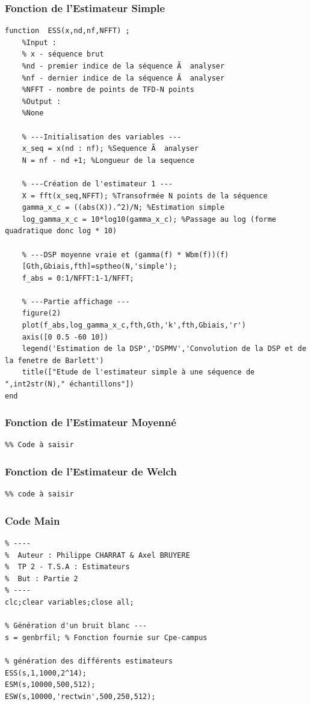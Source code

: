\documentclass{article}
\begin{document}
\subsubsection{Fonction de l'Estimateur Simple }
\begin{verbatim}
function  ESS(x,nd,nf,NFFT) ;
    %Input : 
    % x - séquence brut 
    %nd - premier indice de la séquence Ã  analyser
    %nf - dernier indice de la séquence Ã  analyser
    %NFFT - nombre de points de TFD-N points
    %Output : 
    %None
    
    % ---Initialisation des variables ---
    x_seq = x(nd : nf); %Sequence Ã  analyser
    N = nf - nd +1; %Longueur de la sequence
    
    % ---Création de l'estimateur 1 ---
    X = fft(x_seq,NFFT); %Transofrmée N points de la séquence  
    gamma_x_c = ((abs(X)).^2)/N; %Estimation simple
    log_gamma_x_c = 10*log10(gamma_x_c); %Passage au log (forme quadratique donc log * 10)
    
    % ---DSP moyenne vraie et (gamma(f) * Wbm(f))(f)
    [Gth,Gbiais,fth]=sptheo(N,'simple');
    f_abs = 0:1/NFFT:1-1/NFFT;
    
    % ---Partie affichage ---
    figure(2)
    plot(f_abs,log_gamma_x_c,fth,Gth,'k',fth,Gbiais,'r')
    axis([0 0.5 -60 10])
    legend('Estimation de la DSP','DSPMV','Convolution de la DSP et de la fenetre de Barlett')
    title(["Etude de l'estimateur simple à une séquence de ",int2str(N)," échantillons"])
end
\end{verbatim}
\newpage
\subsubsection{Fonction de l'Estimateur Moyenné }
\begin{verbatim}
%% Code à saisir 
\end{verbatim}
\newpage
\subsubsection{Fonction de l'Estimateur de Welch }
\begin{verbatim}
%% code à saisir
\end{verbatim}
\newpage
\subsubsection{Code Main }
\begin{verbatim}
% ----
%  Auteur : Philippe CHARRAT & Axel BRUYERE
%  TP 2 - T.S.A : Estimateurs
%  But : Partie 2
% ----
clc;clear variables;close all;

% Génération d'un bruit blanc --- 
s = genbrfil; % Fonction fournie sur Cpe-campus

% génération des différents estimateurs
ESS(s,1,1000,2^14);
ESM(s,10000,500,512);
ESW(s,10000,'rectwin',500,250,512);


\end{verbatim}
\newpage
\end{document}
